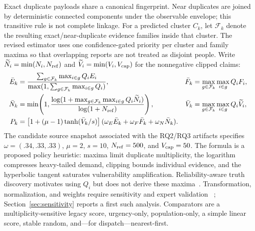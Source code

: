 \documentclass[runningheads]{llncs}
\newcounter{algline}%
\newenvironment{algorithmic}[1][1]{%
    \setcounter{algline}{0}%
    \begin{list}{}{\setlength{\leftmargin}{3.2em}\setlength{\labelwidth}{2.4em}%
      \setlength{\labelsep}{0.6em}\setlength{\itemsep}{0.15ex}\setlength{\parsep}{0pt}%
      \setlength{\topsep}{0.2ex}}\small\normalfont}{\end{list}}%
\newcommand{\algitem}{\stepcounter{algline}%
    \item[{\makebox[2.4em][r]{\thealgline:}}]}%
\newcommand{\State}{\algitem}%
\newcommand{\Function}[2]{\algitem\textbf{function}~\textproc{##1}(##2)}%
\newcommand{\EndFunction}{\algitem\textbf{end function}}%
\newcommand{\Return}{\textbf{return}~}%
\newcommand{\Comment}[1]{\hfill{\footnotesize\(\triangleright\)~##1}}%
\providecommand{\textproc}[1]{\textsc{##1}}%
\begin{document}
Exact duplicate payloads share a canonical fingerprint. Near duplicates are
joined by deterministic connected components under the observable envelope;
this transitive rule is not complete linkage. For a predicted cluster $C_k$,
let $\mathcal F_k$ denote the resulting exact/near-duplicate evidence
families inside that cluster. The revised estimator uses one confidence-gated
priority per cluster and family maxima so that overlapping reports are not
treated as disjoint people. Write
$\widetilde N_i=\min(N_i,N_{\rm ref})$ and
$\widetilde V_i=\min(V_i,V_{\rm cap})$ for the nonnegative clipped claims:
\begin{align}
\bar E_k&=\frac{\sum_{g\in\mathcal F_k}\max_{i\in g}Q_iE_i}
 {\max(1,\sum_{g\in\mathcal F_k}\max_{i\in g}Q_i)},&
\bar F_k&=\max_{g\in\mathcal F_k}\max_{i\in g}Q_iF_i,\nonumber\\
\bar N_k&=\min\!\left(1,\frac{\log(1+\max_{g\in\mathcal F_k}\max_{i\in g}Q_i\widetilde N_i)}
 {\log(1+N_{\rm ref})}\right),&
\bar V_k&=\max_{g\in\mathcal F_k}\max_{i\in g}Q_i\widetilde V_i,\nonumber\\
P_k&=\left[1+(\mu-1)\tanh(\bar V_k/s)\right]
 (\omega_E\bar E_k+\omega_F\bar F_k+\omega_N\bar N_k).
\label{eq:priority}
\end{align}
The candidate source snapshot associated with the RQ2/RQ3 artifacts specifies
$\omega=(.34,.33,.33)$, $\mu=2$, $s=10$, $N_{\rm ref}=500$, and
$V_{\rm cap}=50$. The formula is a proposed policy heuristic: maxima limit
duplicate multiplicity, the logarithm compresses heavy-tailed demand, clipping
bounds individual evidence, and the hyperbolic tangent saturates vulnerability
amplification. Reliability-aware truth discovery motivates using $Q_i$ but does
not derive these maxima~\cite{wang2012truth}. Transformation, normalization,
and weights require sensitivity and expert validation
~\cite{tate2012vulnerability,gralla2014review}; Section~\ref{sec:sensitivity}
reports a first such analysis. Comparators are a
multiplicity-sensitive legacy score, urgency-only, population-only, a simple
linear score, stable random, and---for dispatch---nearest-first.

\end{document}
